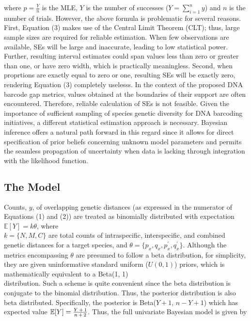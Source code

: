 \documentclass[12pt]{article}
\begin{document}
\noindent where $\hat{p} = \frac{Y}{n}$ is the MLE, $Y$ is the number of successes ($Y = \sum_{i=1}^n{y}$) and $n$ is the number of trials. However, the above formula is problematic for several reasons. First, Equation (3) makes use of the Central Limit Theorem (CLT); thus, large sample sizes are required for reliable estimation. When few observations are available, SEs will be large and inaccurate, leading to low statistical power. Further, resulting interval estimates could span values less than zero or greater than one, or have zero width, which is practically meaningless. Second, when proprtions are exactly equal to zero or one, resulting SEs will be exactly zero, rendering Equation (3) completely uselesss. In the context of the proposed DNA barcode gap metrics, values obtained at the boundaries of their support are often encountered. Therefore, reliable calculation of SEs is not feasible. Given the importance of sufficient sampling of species genetic diversity for DNA barcoding initiatives, a different statistical estimation approach is necessary. Bayesian inference offers a natural path forward in this regard since it allows for direct specification of prior beliefs concerning unknown model parameters and permits the seamless propagation of uncertainty when data is lacking through integration with the likelihood function.

\subsection{The Model}

Counts, $y$, of overlapping genetic distances (as expressed in the numerator of Equations (1) and (2)) are treated as binomially distributed with expectation $\mathbb{E}[Y] = k\theta$, where \\ $k = \{N, M, C\}$ are total counts of intraspecific, interspecific, and combined genetic distances for a target species, and $\theta = \{p_x, q_x, p^{'}_x, q^{'}_x\}$. Although the metrics encompassing $\theta$ are presumed to follow a beta distribution, for simplicity, they are given uninformative standard uniform ($U(0, 1)$) priors, which is mathematically equivalent to a Beta(1, 1) \\ distribution. Such a scheme is quite convenient since the beta distribution is conjugate to the binomial distribution. Thus, the posterior distribution is also beta distributed. Specifically, the posterior is Beta($Y + 1$, $n - Y + 1$) which has expected value $\mathbb{E}[Y] = \frac{Y \hspace{0.5mm} + \hspace{0.5mm} 1}{n \hspace{0.5mm} + \hspace{0.5mm} 2}$. Thus, the full univariate Bayesian model is given by
\end{document}
